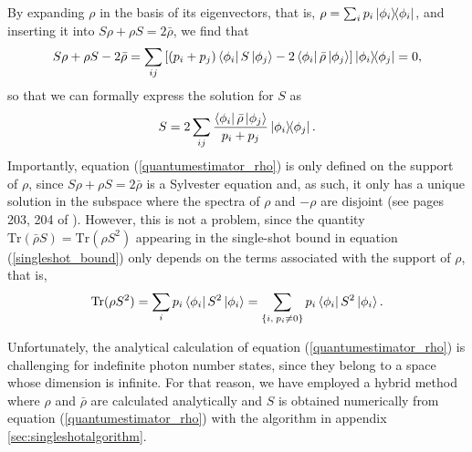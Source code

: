 By expanding $\rho$ in the basis of its eigenvectors, that is, $\rho = \sum_i p_i \ketbra{\phi_i}$, and inserting it into $S \rho + \rho S = 2 \bar{\rho}$, we find that
\begin{equation}
S\rho + \rho S - 2\bar{\rho} = \sum_{ij}\left[\left(p_i + p_j\right)\bra{\phi_i}S\ket{\phi_j} - 2\bra{\phi_i} \bar{\rho} \ket{\phi_j} \right]\ketbra{\phi_i}{\phi_j} = 0,
\end{equation}
so that we can formally express the solution for $S$ as
\begin{equation}
S = 2\sum_{ij} \frac{\bra{\phi_i} \bar{\rho} \ket{\phi_j}}{p_i+p_j}\ketbra{\phi_i}{\phi_j}.
\label{quantumestimator_rho}
\end{equation}
Importantly, equation (\ref{quantumestimator_rho}) is only defined on the support of $\rho$, since $S \rho + \rho S = 2 \bar{\rho}$ is a Sylvester equation and, as such, it only has a unique solution in the subspace where the spectra of $\rho$ and $-\rho$ are disjoint (see pages 203, 204 of \cite{bhatia1997}). However, this is not a problem, since the quantity $\mathrm{Tr}(\bar{\rho}S) = \mathrm{Tr}(\rho S^2)$ appearing in the single-shot bound in equation (\ref{singleshot_bound}) only depends on the terms associated with the support of $\rho$, that is, 
\begin{equation}
\mathrm{Tr}(\rho S^2) = \sum_{i} p_i \bra{\phi_i} S^2 \ket{\phi_i} = \sum\limits_{\substack{\lbrace i,\hspace{0.2em} p_i\neq 0 \rbrace}} p_i \bra{\phi_i} S^2 \ket{\phi_i}.
\end{equation}

Unfortunately, the analytical calculation of equation (\ref{quantumestimator_rho}) is challenging for indefinite photon number states, since they belong to a space whose dimension is infinite. For that reason, we have employed a hybrid method where $\rho$ and $\bar{\rho}$ are calculated analytically and $S$ is obtained numerically from equation (\ref{quantumestimator_rho}) with the algorithm in appendix \ref{sec:singleshotalgorithm}. 

